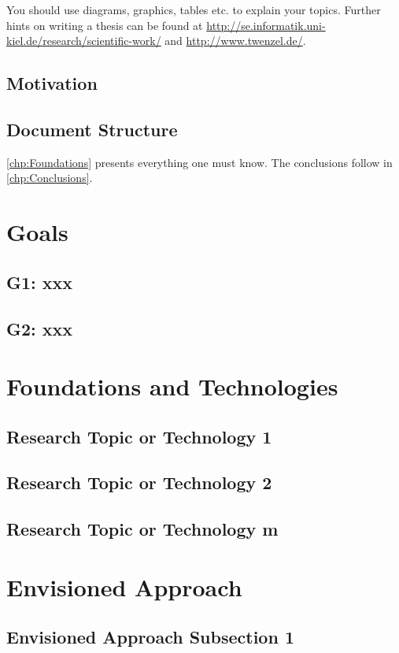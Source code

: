   You should use diagrams, graphics, tables etc. to explain your topics.
  Further hints on writing a thesis can be found at \url{http://se.informatik.uni-kiel.de/research/scientific-work/} and \url{http://www.twenzel.de/}.

  \section{Motivation}
    \blindtext
  \section{Document Structure}
    \autoref{chp:Foundations} presents everything one must know. The conclusions follow in \autoref{chp:Conclusions}. 

\chapter{Goals}\label{chp:Goals}
  \section{G1: xxx}
    \blindtext
  \section{G2: xxx}
    \blindtext
    
\chapter{Foundations and Technologies}\label{chp:Foundations}
  \section{Research Topic or Technology 1}
    \blindtext
  \section{Research Topic or Technology 2}
    \blindtext
  \section{Research Topic or Technology m}
    \blindtext

\chapter{Envisioned Approach}\label{chp:Approach}
  \section{Envisioned Approach Subsection 1}
    \blindtext
